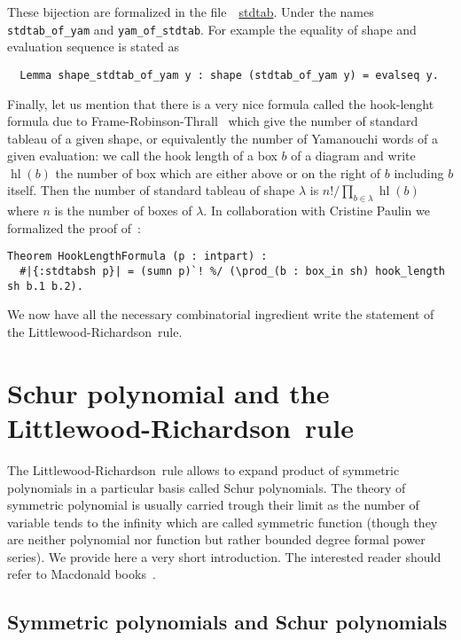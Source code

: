 \documentclass[12pt]{article}
\let\verb=\lstinline
\newcommand{\LR}{Littlewood-Richardson\ }
\begin{document}
These bijection are formalized in the
file~~\href{http://hivert.github.io/Coq-Combi/Combi.Combi.stdtab.html}{stdtab}. Under
the names \verb|stdtab_of_yam| and \verb|yam_of_stdtab|. For example the
equality of shape and evaluation sequence is stated as
\begin{lstlisting}
  Lemma shape_stdtab_of_yam y : shape (stdtab_of_yam y) = evalseq y.
\end{lstlisting}

Finally, let us mention that there is a very nice formula called the
hook-lenght formula due to Frame-Robinson-Thrall~\cite{FRT54} which give the
number of standard tableau of a given shape, or equivalently the number of
Yamanouchi words of a given evaluation: we call the hook length of a box $b$
of a diagram and write $\operatorname{hl}(b)$ the number of box which are
either above or on the right of $b$ including $b$ itself. Then the number of
standard tableau of shape $\lambda$ is
$n!/\prod_{b\in\lambda}\operatorname{hl}(b)$ where $n$ is the number of boxes
of $\lambda$. In collaboration with Cristine Paulin we formalized the proof
of~\cite{GNW1979}:
\begin{lstlisting}
Theorem HookLengthFormula (p : intpart) :
  #|{:stdtabsh p}| = (sumn p)`! %/ (\prod_(b : box_in sh) hook_length sh b.1 b.2).
\end{lstlisting}
We now have all the necessary combinatorial ingredient write the statement of
the \LR rule.

\section{Schur polynomial and the \LR rule}

The \LR rule allows to expand product of symmetric polynomials in a particular
basis called Schur polynomials. The theory of symmetric polynomial is usually
carried trough their limit as the number of variable tends to the infinity
which are called symmetric function (though they are neither polynomial nor
function but rather bounded degree formal power series). We provide here a
very short introduction. The interested reader should refer to Macdonald
books~\cite{Macdonald95}.

\subsection{Symmetric polynomials and Schur polynomials}
\end{document}
